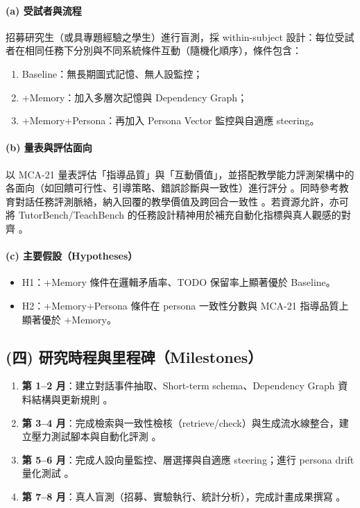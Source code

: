 \paragraph{(a) 受試者與流程}
招募研究生（或具專題經驗之學生）進行盲測，採 within-subject 設計：每位受試者在相同任務下分別與不同系統條件互動（隨機化順序），條件包含：
\begin{enumerate}
  \item Baseline：無長期圖式記憶、無人設監控；
  \item +Memory：加入多層次記憶與 Dependency Graph；
  \item +Memory+Persona：再加入 Persona Vector 監控與自適應 steering。
\end{enumerate}

\paragraph{(b) 量表與評估面向}
以 MCA-21 量表評估「指導品質」與「互動價值」，並搭配教學能力評測架構中的各面向（如回饋可行性、引導策略、錯誤診斷與一致性）進行評分 \citep{hyun2022mca21,maurya-etal-2025-unifying}。同時參考教育對話任務評測脈絡，納入回覆的教學價值及跨回合一致性 \citep{tack-etal-2023-bea}。若資源允許，亦可將 TutorBench/TeachBench 的任務設計精神用於補充自動化指標與真人觀感的對齊 \citep{a2510_02663v1_tutorbench,a2601_21375v1_teachbench}。

\paragraph{(c) 主要假設（Hypotheses）}
\begin{itemize}
  \item H1：+Memory 條件在邏輯矛盾率、TODO 保留率上顯著優於 Baseline。
  \item H2：+Memory+Persona 條件在 persona 一致性分數與 MCA-21 指導品質上顯著優於 +Memory。
\end{itemize}

\subsection*{(四) 研究時程與里程碑（Milestones）}
\begin{enumerate}
  \item \textbf{第 1--2 月}：建立對話事件抽取、Short-term schema、Dependency Graph 資料結構與更新規則 \citep{a2602_05665v1_graphagentmemory}。
  \item \textbf{第 3--4 月}：完成檢索與一致性檢核（retrieve/check）與生成流水線整合，建立壓力測試腳本與自動化評測 \citep{a2402_17753v1_locomomemoryeval}。
  \item \textbf{第 5--6 月}：完成人設向量監控、層選擇與自適應 steering；進行 persona drift 量化測試 \citep{a2507_21509v3_personavectors}。
  \item \textbf{第 7--8 月}：真人盲測（招募、實驗執行、統計分析），完成計畫成果撰寫 \citep{hyun2022mca21,maurya-etal-2025-unifying}。
\end{enumerate}